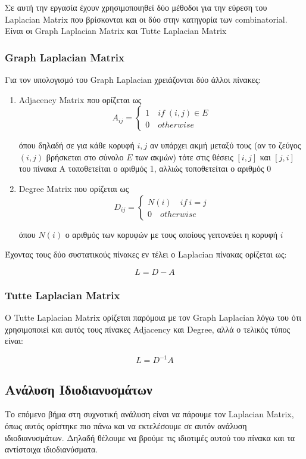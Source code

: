 \documentclass[draft]{article}
\begin{document}
Σε αυτή την εργασία έχουν χρησιμοποιηθεί δύο μέθοδοι για την εύρεση του Laplacian Matrix
που βρίσκονται και οι δύο στην κατηγορία των combinatorial.
Είναι οι Graph Laplacian Matrix και Tutte Laplacian Matrix

\subsubsection{Graph Laplacian Matrix}
Για τον υπολογισμό του Graph Laplacian χρειάζονται δύο άλλοι πίνακες:
\begin{enumerate}
	\item Adjacency Matrix που ορίζεται ως
		\[
			A_{ij} = \begin{cases}
				1 \quad if \; (i, j) \in E \\
				0 \quad otherwise
			\end{cases}
		\]

		όπου δηλαδή σε για κάθε κορυφή $i, j$ αν υπάρχει ακμή μεταξύ τους
		(αν το ζεύγος $(i,j)$ βρήσκεται στο σύνολο $E$ των ακμών)
		τότε στις θέσεις $[i, j]$ και $[j, i]$ του πίνακα Α τοποθετείται ο αριθμός 1,
		αλλιώς τοποθετείται ο αριθμός 0

	\item Degree Matrix που ορίζεται ως
		\[
			D_{ij} = \begin{cases}
				N(i) \quad if \ i=j \\
				0 \quad otherwise
			\end{cases}
		\]

		όπου $N(i)$ ο αριθμός των κορυφών με τους οποίους γειτονεύει η κορυφή $i$
\end{enumerate}

\noindent
Έχοντας τους δύο συστατικούς πίνακες εν τέλει ο Laplacian πίνακας ορίζεται ως:

\[
	L = D - A
\]

\subsubsection{Tutte Laplacian Matrix}
Ο Tutte Laplacian Matrix ορίζεται παρόμοια με τον Graph Laplacian
λόγω του ότι χρησιμοποιεί και αυτός τους πίνακες Adjacency και Degree,
αλλά ο τελικός τύπος είναι:

\[
	L = D^{-1}A
\]

\subsection{Ανάλυση Ιδιοδιανυσμάτων}
Το επόμενο βήμα στη συχνοτική ανάλυση είναι να πάρουμε τον Laplacian Matrix,
όπως αυτός ορίστηκε πιο πάνω και να εκτελέσουμε σε αυτόν ανάλυση ιδιοδιανυσμάτων.
Δηλαδή θέλουμε να βρούμε τις ιδιοτιμές αυτού του πίνακα και τα αντίστοιχα ιδιοδιανύσματα.
\end{document}
